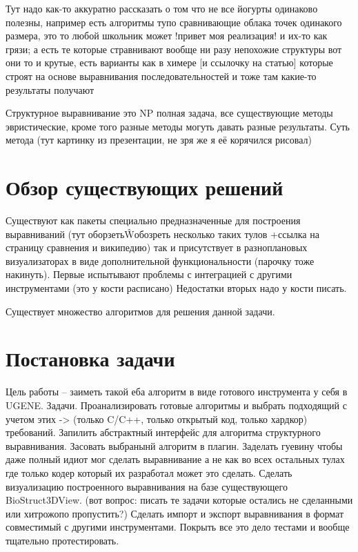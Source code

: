 \documentclass[a4paper, 12pt, titlepage, utf8]{extarticle}
\begin{document}
Тут надо как-то аккуратно рассказать о том что не все йогурты одинаково полезны, например есть алгоритмы тупо сравнивающие облака точек одинакого размера, это то любой школьник может !привет моя реализация! и их-то как грязи; а есть те которые стравнивают вообще ни разу непохожие структуры вот они то и крутые, есть варианты как в химере [и ссылочку на статью] которые строят на основе выравнивания последовательностей и тоже там какие-то результаты получают

Структурное выравнивание это NP полная задача, все существующие методы эвристические, кроме того разные методы могуть давать разные результаты.
Суть метода (тут картинку из презентации, не зря же я её корячился рисовал)

\section{Обзор существующих решений}
Существуют как пакеты специально предназначенные для построения выравниваний (тут оборзеть\^Wобозреть несколько таких тулов +ссылка на страницу сравнения и википедию) так и присутствует в разноплановых визуализаторах в виде дополнительной функциональности (парочку тоже накинуть).
Первые испытывают проблемы с интеграцией с другими инструментами (это у кости расписано) 
Недостатки вторых надо у кости писать.

Существует множество алгоритмов для решения данной задачи. 

\section{Постановка задачи}	%

Цель работы -- заиметь такой еба алгоритм в виде готового инструмента у себя в UGENE. 
Задачи.
Проанализировать готовые алгоритмы и выбрать подходящий с учетом этих -> (только C/C++, только открытый код, только хардкор) требований. Запилить абстрактный интерфейс для алгоритма структурного выравнивания. Засовать выбранынй алгоритм в плагин. Заделать гуевину чтобы даже полный идиот мог сделать выравнивание а не как во всех остальных тулах где только кодер который их разработал может это сделать. Сделать визуализацию построенного выравнивания на базе существующего BioStruct3DView. (вот вопрос: писать те задачи которые остались не сделанными или хитрожопо пропустить?) Сделать импорт и экспорт выравнивания в формат совместимый с другими инструментами. Покрыть все это дело тестами и вообще тщательно протестировать.
\end{document}
